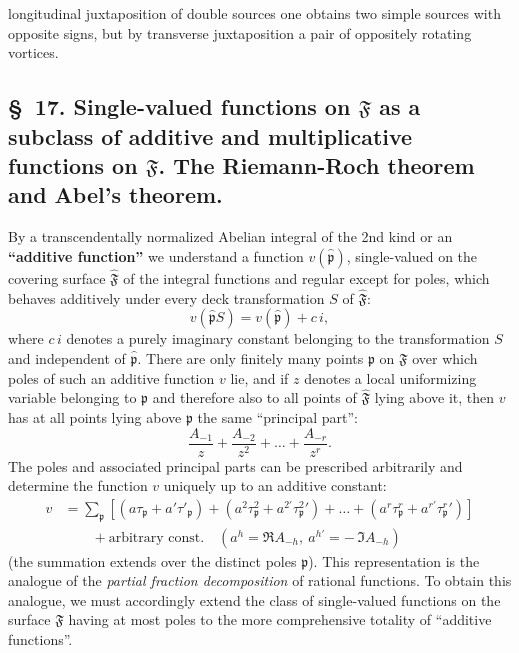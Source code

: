 \documentclass{article}
\begin{document}
longitudinal juxtaposition of double sources one obtains two simple sources with opposite signs, but by transverse juxtaposition a pair of oppositely rotating vortices.

\subsection*{§~17. Single-valued functions on $\mathfrak{F}$ as a subclass of additive and multiplicative functions on $\mathfrak{F}$. The Riemann-Roch theorem and Abel's theorem.}

By a transcendentally normalized Abelian integral of the 2nd kind or an \textbf{``additive function''} we understand a function $v(\hat{\mathfrak{p}})$, single-valued on the covering surface $\hat{\mathfrak{F}}$ of the integral functions and regular except for poles, which behaves additively under every deck transformation $S$ of $\hat{\mathfrak{F}}$:
\[ v(\hat{\mathfrak{p}}S) = v(\hat{\mathfrak{p}}) + c\,i, \]
where $c\,i$ denotes a purely imaginary constant belonging to the transformation $S$ and independent of $\hat{\mathfrak{p}}$. There are only finitely many points $\mathfrak{p}$ on $\mathfrak{F}$ over which poles of such an additive function $v$ lie, and if $z$ denotes a local uniformizing variable belonging to $\mathfrak{p}$ and therefore also to all points of $\hat{\mathfrak{F}}$ lying above it, then $v$ has at all points lying above $\mathfrak{p}$ the same ``principal part'':
\[ \frac{A_{-1}}{z} + \frac{A_{-2}}{z^2} + \dots + \frac{A_{-r}}{z^r}. \]
The poles and associated principal parts can be prescribed arbitrarily and determine the function $v$ uniquely up to an additive constant:
\[ \begin{aligned}
v &= \sum\limits_\mathfrak{p} \left[ (a\tau_\mathfrak{p} + a'\tau'_\mathfrak{p}) + (a^2\tau_\mathfrak{p}^2 + a^{2\prime}{\tau_\mathfrak{p}^2}') + \dots + (a^r\tau_\mathfrak{p}^r + a^{r\prime}{\tau_\mathfrak{p}^r}') \right] \\
&\qquad + \text{arbitrary const.} \quad (a^h = \Re A_{-h}, \ a^{h\prime} = -\,\Im A_{-h})
\end{aligned} \tag{40} \]
(the summation extends over the distinct poles $\mathfrak{p}$). This representation is the analogue of the \emph{partial fraction decomposition} of rational functions. To obtain this analogue, we must accordingly extend the class of single-valued functions on the surface $\mathfrak{F}$ having at most poles to the more comprehensive totality of ``additive functions''.
\end{document}

